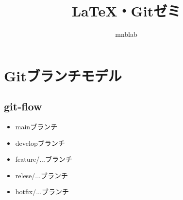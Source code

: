 \documentclass[%
        uplatex,%
        dvipdfmx,%
        a4paper%
]{jsarticle}
\begin{document}
\title{~\LaTeX ・Gitゼミ~}
\author{mnblab}
\maketitle
\section{Gitブランチモデル}
\subsection{git-flow}
\begin{itemize} 
  \item mainブランチ
  \item developブランチ
  \item feature/...ブランチ
  \item relese/...ブランチ
  \item hotfix/...ブランチ
\end{itemize}
\end{document}
